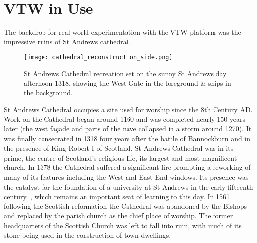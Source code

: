 
\clearpage


\section{VTW in Use}

\newcommand{\thinkpadFootnote}{\footnote{\url{http://support.lenovo.com/us/en/documents/pd012148}}}

\newcommand{\wrtFootnote}{\footnote{\url{http://support.linksys.com/en-eu/support/routers/WRT54G}}}


The backdrop for real world experimentation with the VTW platform was the impressive ruins of St Andrews cathedral.

\begin{figure}[h]
\centering
  \texttt{[image: cathedral\_reconstruction\_side.png]}
  \caption{St Andrews Cathedral recreation set on the sunny St Andrews day afternoon 1318, showing the West Gate in the foreground \& ships in the background.}
  \label{cathedral_reconstruction_side.png}
\end{figure}



St Andrews Cathedral occupies a site used for worship since the 8th Century AD. Work on the Cathedral began around 1160 and was completed nearly 150 years later (the west fa\c{c}ade and parts of the nave collapsed in a storm around 1270). It was finally consecrated in 1318 four years after the battle of Bannockburn and in the presence of King Robert I of Scotland. St Andrews Cathedral was in its prime, the centre of Scotland’s religious life, its largest and most magnificent church. In 1378 the Cathedral suffered a significant fire prompting
a reworking of many of its features including the West and East End windows. Its presence was the catalyst for the foundation of a university at St Andrews in the early fifteenth century~\cite{Fawcett2011}, which remains an important seat of learning to this day. In 1561 following the Scottish reformation the Cathedral was abandoned by the Bishops and replaced by the parish church as the chief place of worship. The former headquarters of the Scottish Church was left to fall into ruin, with much of its stone being used in the construction of town dwellings.

